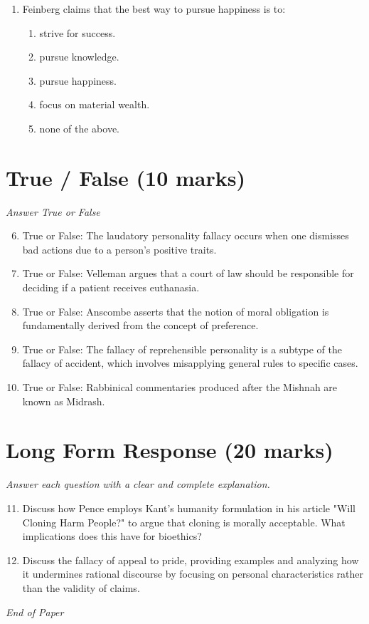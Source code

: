\documentclass[12pt]{article}
\begin{document}
\begin{enumerate}[label=\arabic*.]
\begin{enumerate}[label=(\alph*)]
    \item merchants who sell harmful products.
    \item war profiteers exploiting conflict.
\end{enumerate}
\item Feinberg claims that the best way to pursue happiness is to:
\begin{enumerate}[label=(\alph*)]
    \item strive for success.
    \item pursue knowledge.
    \item pursue happiness.
    \item focus on material wealth.
    \item none of the above.
\end{enumerate}
\end{enumerate}

\section*{True / False (10 marks)}
\textit{Answer True or False}
\begin{enumerate}[label=\arabic*.]
\setcounter{enumi}{5}
\item True or False: The laudatory personality fallacy occurs when one dismisses bad actions due to a person's positive traits.
\item True or False: Velleman argues that a court of law should be responsible for deciding if a patient receives euthanasia.
\item True or False: Anscombe asserts that the notion of moral obligation is fundamentally derived from the concept of preference.
\item True or False: The fallacy of reprehensible personality is a subtype of the fallacy of accident, which involves misapplying general rules to specific cases.
\item True or False: Rabbinical commentaries produced after the Mishnah are known as Midrash.
\end{enumerate}

\section*{Long Form Response (20 marks)}
\textit{Answer each question with a clear and complete explanation.}
\begin{enumerate}[label=\arabic*.]
\setcounter{enumi}{10}
\item Discuss how Pence employs Kant's humanity formulation in his article "Will Cloning Harm People?" to argue that cloning is morally acceptable. What implications does this have for bioethics?
\item Discuss the fallacy of appeal to pride, providing examples and analyzing how it undermines rational discourse by focusing on personal characteristics rather than the validity of claims.
\end{enumerate}

\vfill
\noindent\textit{End of Paper}
\end{document}
